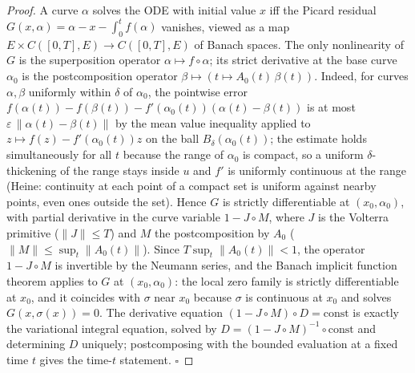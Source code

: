 \begin{proof}
  \leanok
  A curve $\alpha$ solves the ODE with initial value $x$ iff the Picard
  residual $G(x, \alpha) = \alpha - x - \int_0^t f(\alpha)$ vanishes, viewed as
  a map $E \times C([0,T], E) \to C([0,T], E)$ of Banach spaces. The only
  nonlinearity of $G$ is the superposition operator
  $\alpha \mapsto f \circ \alpha$; its strict derivative at the base curve
  $\alpha_0$ is the postcomposition operator
  $\beta \mapsto (t \mapsto A_0(t)\,\beta(t))$. Indeed, for curves
  $\alpha, \beta$ uniformly within $\delta$ of $\alpha_0$, the pointwise error
  $f(\alpha(t)) - f(\beta(t)) - f'(\alpha_0(t))(\alpha(t) - \beta(t))$ is at
  most $\varepsilon\,\|\alpha(t) - \beta(t)\|$ by the mean value inequality
  applied to $z \mapsto f(z) - f'(\alpha_0(t))z$ on the ball
  $B_\delta(\alpha_0(t))$; the estimate holds simultaneously for all $t$
  because the range of $\alpha_0$ is compact, so a uniform $\delta$-thickening
  of the range stays inside $u$ and $f'$ is uniformly continuous at the range
  (Heine: continuity at each point of a compact set is uniform against nearby
  points, even ones outside the set). Hence $G$ is strictly differentiable at
  $(x_0, \alpha_0)$, with partial derivative in the curve variable
  $1 - J \circ M$, where $J$ is the Volterra primitive
  ($\|J\| \le T$) and $M$ the postcomposition by $A_0$
  ($\|M\| \le \sup_t \|A_0(t)\|$). Since $T \sup_t \|A_0(t)\| < 1$, the
  operator $1 - J \circ M$ is invertible by the Neumann series, and the Banach
  implicit function theorem applies to $G$ at $(x_0, \alpha_0)$: the local zero
  family is strictly differentiable at $x_0$, and it coincides with $\sigma$
  near $x_0$ because $\sigma$ is continuous at $x_0$ and solves
  $G(x, \sigma(x)) = 0$. The derivative equation
  $(1 - J \circ M) \circ D = \mathrm{const}$ is exactly the variational
  integral equation, solved by $D = (1 - J \circ M)^{-1} \circ \mathrm{const}$
  and determining $D$ uniquely; postcomposing with the bounded evaluation at a
  fixed time $t$ gives the time-$t$ statement. $\square$
\end{proof}

